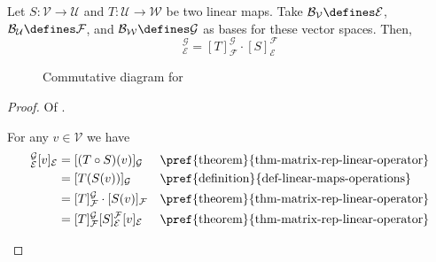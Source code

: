 \begin{thm}\label{thm-composition-linear-operators-matrix-rep}
	Let $S:\mathcal{V}\to\mathcal{U}$ and $T:\mathcal{U}\to\mathcal{W}$ be two
	linear maps. Take $\mathcal{B}_\mathcal{V}\defines\mathcal{E}$,
	$\mathcal{B}_\mathcal{U}\defines\mathcal{F}$, and
	$\mathcal{B}_\mathcal{W}\defines\mathcal{G}$ as bases for these vector spaces.
	Then,
	\begin{equation}
		[T \circ S]_\mathcal{E}^\mathcal{G}=[T]_\mathcal{F}^\mathcal{G}\cdot[S]_\mathcal{E}^\mathcal{F}
	\end{equation}
	\begin{figure}[ht!]
		\centering
		\caption{Commutative diagram for }
		\label{commutative-diagram:linear-composition:5}
	\end{figure}
\end{thm}

\begin{proof}
	Of .
	\begin{flushleft}
		For any $v\in\mathcal{V}$ we have
		\begin{align*}
			[T \circ S]_\mathcal{E}^\mathcal{G}[v]_\mathcal{E}
			 & = [(T \circ S)(v)]_\mathcal{G}                                           &  & \text{\pref{theorem}{thm-matrix-rep-linear-operator}} \\
			 & = [T(S(v))]_\mathcal{G}                                                  &  & \text{\pref{definition}{def-linear-maps-operations}}  \\
			 & = [T]_\mathcal{F}^\mathcal{G}\cdot [S(v)]_\mathcal{F}                    &  & \text{\pref{theorem}{thm-matrix-rep-linear-operator}} \\
			 & = [T]_\mathcal{F}^\mathcal{G} [S]_\mathcal{E}^\mathcal{F}[v]_\mathcal{E} &  & \text{\pref{theorem}{thm-matrix-rep-linear-operator}}
		\end{align*}
	\end{flushleft}
\end{proof}

